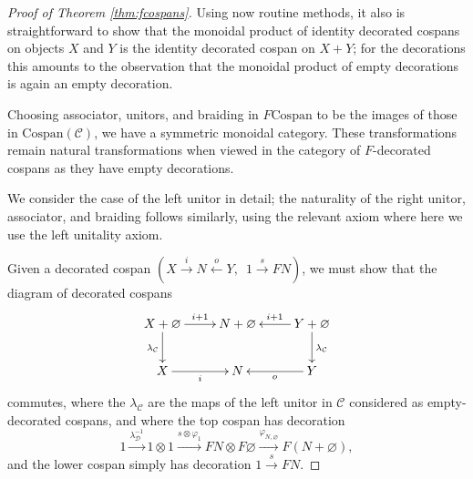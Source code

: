 \begin{proof}[Proof of Theorem \ref{thm:fcospans}]
Using now routine methods, it also is straightforward to show that the monoidal
product of identity decorated cospans on objects $X$ and $Y$ is the identity
decorated cospan on $X+Y$; for the decorations this amounts to the observation
that the monoidal product of empty decorations is again an empty decoration.

  Choosing associator, unitors, and braiding in $F\mathrm{Cospan}$ to be the
  images of those in $\mathrm{Cospan(\mathcal{C})}$, we have a symmetric
  monoidal category. These transformations remain natural transformations when
  viewed in the category of $F$-decorated cospans as they have empty
  decorations.
  
We consider the case of the left unitor in detail; the naturality of the right unitor,
associator, and braiding follows similarly, using the relevant axiom where here
we use the left unitality axiom.

Given a decorated cospan $(X \stackrel{i}\longrightarrow N
\stackrel{o}\longleftarrow Y,\enspace 1 \stackrel{s}\longrightarrow FN)$, we
must show that the diagram of decorated cospans
\[
  \xymatrix{
    X+\varnothing \ar[r]^{i+1} \ar[d]_{\lambda_{\mathcal C}} & N+\varnothing & Y+\varnothing
    \ar[l]_{i+1} \ar[d]^{\lambda_{\mathcal C}} \\
    X \ar[r]_{i} & N & Y \ar[l]^{o} 
  }
\]
commutes, where the $\lambda_{\mathcal C}$ are the maps of the left unitor in $\mathcal C$
considered as empty-decorated cospans, and where the top cospan has decoration 
\[
  1 \stackrel{\lambda^{-1}_{\mathcal D}}{\longrightarrow} 1 \otimes 1 \stackrel{s \otimes
  \varphi_1}\longrightarrow FN \otimes F\varnothing
  \stackrel{\varphi_{N,\varnothing}}\longrightarrow F(N+\varnothing),
\]
and the lower cospan simply has decoration $1 \stackrel{s}{\longrightarrow} FN$. 


\end{proof}

